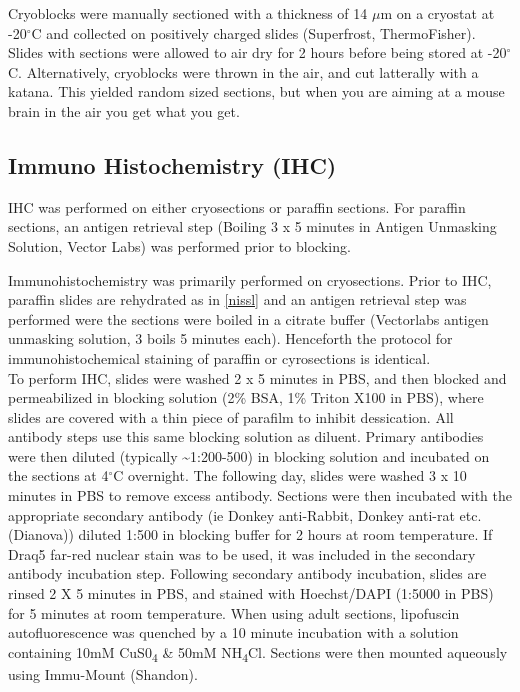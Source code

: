 \documentclass[onehalf,12pt]{beavtex}
\begin{document}
  Cryoblocks were manually sectioned with a thickness of 14 \(\mu\)m on a
  cryostat at -20\(^\circ\)C and collected on positively charged slides
  (Superfrost, ThermoFisher). Slides with sections were allowed to air dry
  for 2 hours before being stored at -20\(^\circ\)C. Alternatively,
  cryoblocks were thrown in the air, and cut latterally with a katana.
  This yielded random sized sections, but when you are aiming at a mouse
  brain in the air you get what you get.
  
  \subsection{Immuno Histochemistry
  (IHC)}\label{immuno-histochemistry-ihc}
  
  IHC was performed on either cryosections or paraffin sections. For
  paraffin sections, an antigen retrieval step (Boiling 3 x 5 minutes in
  Antigen Unmasking Solution, Vector Labs) was performed prior to
  blocking.
  
  Immunohistochemistry was primarily performed on cryosections. Prior to
  IHC, paraffin slides are rehydrated as in \ref{nissl} and an antigen
  retrieval step was performed were the sections were boiled in a citrate
  buffer (Vectorlabs antigen unmasking solution, 3 boils 5 minutes each).
  Henceforth the protocol for immunohistochemical staining of paraffin or
  cyrosections is identical.\\
  To perform IHC, slides were washed 2 x 5 minutes in PBS, and then
  blocked and permeabilized in blocking solution (2\% BSA, 1\% Triton X100
  in PBS), where slides are covered with a thin piece of parafilm to
  inhibit dessication. All antibody steps use this same blocking solution
  as diluent. Primary antibodies were then diluted (typically
  \textasciitilde{}1:200-500) in blocking solution and incubated on the
  sections at 4\(^\circ\)C overnight. The following day, slides were
  washed 3 x 10 minutes in PBS to remove excess antibody. Sections were
  then incubated with the appropriate secondary antibody (ie Donkey
  anti-Rabbit, Donkey anti-rat etc. (Dianova)) diluted 1:500 in blocking
  buffer for 2 hours at room temperature. If Draq5 far-red nuclear stain
  was to be used, it was included in the secondary antibody incubation
  step. Following secondary antibody incubation, slides are rinsed 2 X 5
  minutes in PBS, and stained with Hoechst/DAPI (1:5000 in PBS) for 5
  minutes at room temperature. When using adult sections, lipofuscin
  autofluorescence was quenched by a 10 minute incubation with a solution
  containing 10mM CuS0\textsubscript{4} \& 50mM NH\textsubscript{4}Cl.
  Sections were then mounted aqueously using Immu-Mount (Shandon).
  
\end{document}
